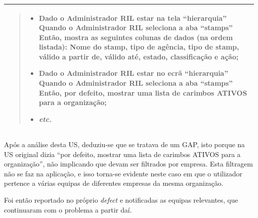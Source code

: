 \begin{table}[H]
\begin{tabularx}{1\textwidth}{|>{\raggedright\arraybackslash}X|}
\begin{quote}
\begin{itemize}
                                \item Dado o Administrador RIL estar na tela ``hierarquia'' \newline
                                Quando o Administrador RIL seleciona a aba ``stamps'' \newline
                                Então, mostra as seguintes colunas de dados (na ordem listada): Nome do stamp, tipo de agência, tipo de stamp, válido a partir de, válido até, estado, classificação e ação;

                                \item Dado o Administrador RIL estar no ecrã ``hierarquia'' \newline
                                Quando o Administrador RIL seleciona a aba ``stamps'' \newline
                                Então, por defeito, mostrar uma lista de carimbos ATIVOS para a organização;
                            
                                \item \textit{etc.}
                            \end{itemize}
                            
                        \end{quote}
                        \\
                        \hline
                    \end{tabularx}
                \end{table}

                Após a análise desta US, deduziu-se que se tratava de um GAP, isto porque na US original dizia ``por defeito, mostrar uma lista de carimbos ATIVOS para a organização'', não implicando que devam ser filtrados por empresa. Esta filtragem não se faz na aplicação, e isso torna-se evidente neste caso em que o utilizador pertence a várias equipas de diferentes empresas da mesma organização.

                Foi então reportado no próprio \textit{defect} e notificadas as equipas relevantes, que continuaram com o problema a partir daí.

